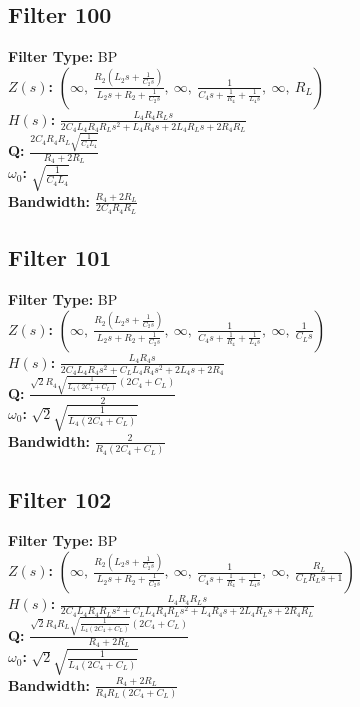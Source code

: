 \documentclass{article}
\begin{document}
\subsection*{Filter 100}
\textbf{Filter Type:} BP \\ 
\textbf{$Z(s)$:} $\left( \infty, \  \frac{R_{2} \left(L_{2} s + \frac{1}{C_{2} s}\right)}{L_{2} s + R_{2} + \frac{1}{C_{2} s}}, \  \infty, \  \frac{1}{C_{4} s + \frac{1}{R_{4}} + \frac{1}{L_{4} s}}, \  \infty, \  R_{L}\right)$ \\ 
\textbf{$H(s)$:} $\frac{L_{4} R_{4} R_{L} s}{2 C_{4} L_{4} R_{4} R_{L} s^{2} + L_{4} R_{4} s + 2 L_{4} R_{L} s + 2 R_{4} R_{L}}$ \\ 
\textbf{Q:} $\frac{2 C_{4} R_{4} R_{L} \sqrt{\frac{1}{C_{4} L_{4}}}}{R_{4} + 2 R_{L}}$ \\ 
\textbf{$\omega_0$:} $\sqrt{\frac{1}{C_{4} L_{4}}}$ \\ 
\textbf{Bandwidth:} $\frac{R_{4} + 2 R_{L}}{2 C_{4} R_{4} R_{L}}$ \\ 
\subsection*{Filter 101}
\textbf{Filter Type:} BP \\ 
\textbf{$Z(s)$:} $\left( \infty, \  \frac{R_{2} \left(L_{2} s + \frac{1}{C_{2} s}\right)}{L_{2} s + R_{2} + \frac{1}{C_{2} s}}, \  \infty, \  \frac{1}{C_{4} s + \frac{1}{R_{4}} + \frac{1}{L_{4} s}}, \  \infty, \  \frac{1}{C_{L} s}\right)$ \\ 
\textbf{$H(s)$:} $\frac{L_{4} R_{4} s}{2 C_{4} L_{4} R_{4} s^{2} + C_{L} L_{4} R_{4} s^{2} + 2 L_{4} s + 2 R_{4}}$ \\ 
\textbf{Q:} $\frac{\sqrt{2} R_{4} \sqrt{\frac{1}{L_{4} \left(2 C_{4} + C_{L}\right)}} \left(2 C_{4} + C_{L}\right)}{2}$ \\ 
\textbf{$\omega_0$:} $\sqrt{2} \sqrt{\frac{1}{L_{4} \left(2 C_{4} + C_{L}\right)}}$ \\ 
\textbf{Bandwidth:} $\frac{2}{R_{4} \left(2 C_{4} + C_{L}\right)}$ \\ 
\subsection*{Filter 102}
\textbf{Filter Type:} BP \\ 
\textbf{$Z(s)$:} $\left( \infty, \  \frac{R_{2} \left(L_{2} s + \frac{1}{C_{2} s}\right)}{L_{2} s + R_{2} + \frac{1}{C_{2} s}}, \  \infty, \  \frac{1}{C_{4} s + \frac{1}{R_{4}} + \frac{1}{L_{4} s}}, \  \infty, \  \frac{R_{L}}{C_{L} R_{L} s + 1}\right)$ \\ 
\textbf{$H(s)$:} $\frac{L_{4} R_{4} R_{L} s}{2 C_{4} L_{4} R_{4} R_{L} s^{2} + C_{L} L_{4} R_{4} R_{L} s^{2} + L_{4} R_{4} s + 2 L_{4} R_{L} s + 2 R_{4} R_{L}}$ \\ 
\textbf{Q:} $\frac{\sqrt{2} R_{4} R_{L} \sqrt{\frac{1}{L_{4} \left(2 C_{4} + C_{L}\right)}} \left(2 C_{4} + C_{L}\right)}{R_{4} + 2 R_{L}}$ \\ 
\textbf{$\omega_0$:} $\sqrt{2} \sqrt{\frac{1}{L_{4} \left(2 C_{4} + C_{L}\right)}}$ \\ 
\textbf{Bandwidth:} $\frac{R_{4} + 2 R_{L}}{R_{4} R_{L} \left(2 C_{4} + C_{L}\right)}$ \\ 
\end{document}
